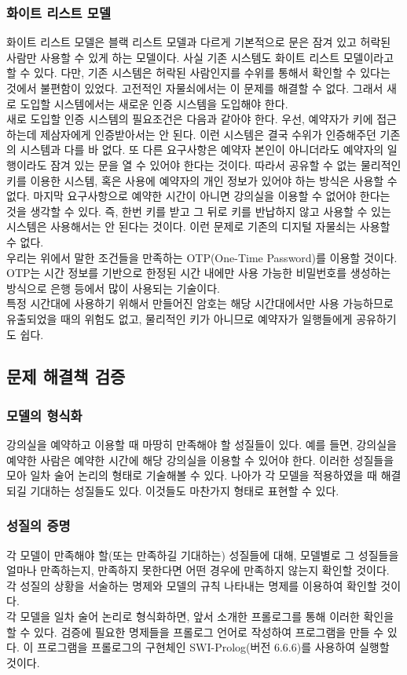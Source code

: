 \documentclass[11pt,a4paper]{article}
\begin{document}
\subsubsection{화이트 리스트 모델}
화이트 리스트 모델은 블랙 리스트 모델과 다르게 기본적으로 문은 잠겨 있고 허락된 사람만 사용할 수 있게 하는 모델이다. 사실 기존 시스템도 화이트 리스트 모델이라고 할 수 있다. 다만, 기존 시스템은 허락된 사람인지를 수위를 통해서 확인할 수 있다는 것에서 불편함이 있었다. 고전적인 자물쇠에서는 이 문제를 해결할 수 없다. 그래서 새로 도입할 시스템에서는 새로운 인증 시스템을 도입해야 한다.\\
새로 도입할 인증 시스템의 필요조건은 다음과 같아야 한다. 우선, 예약자가 키에 접근하는데 제삼자에게 인증받아서는 안 된다. 이런 시스템은 결국 수위가 인증해주던 기존의 시스템과 다를 바 없다. 또 다른 요구사항은 예약자 본인이 아니더라도 예약자의 일행이라도 잠겨 있는 문을 열 수 있어야 한다는 것이다. 따라서 공유할 수 없는 물리적인 키를 이용한 시스템, 혹은 사용에 예약자의 개인 정보가 있어야 하는 방식은 사용할 수 없다. 마지막 요구사항으로 예약한 시간이 아니면 강의실을 이용할 수 없어야 한다는 것을 생각할 수 있다. 즉, 한번 키를 받고 그 뒤로 키를 반납하지 않고 사용할 수 있는 시스템은 사용해서는 안 된다는 것이다. 이런 문제로 기존의 디지털 자물쇠는 사용할 수 없다.\\
우리는 위에서 말한 조건들을 만족하는 OTP(One-Time Password)를 이용할 것이다. OTP는 시간 정보를 기반으로 한정된 시간 내에만 사용 가능한 비밀번호를 생성하는 방식으로 은행 등에서 많이 사용되는 기술이다.\\
특정 시간대에 사용하기 위해서 만들어진 암호는 해당 시간대에서만 사용 가능하므로 유출되었을 때의 위험도 없고, 물리적인 키가 아니므로 예약자가 일행들에게 공유하기도 쉽다.

\subsection{문제 해결책 검증}

\subsubsection{모델의 형식화}
강의실을 예약하고 이용할 때 마땅히 만족해야 할 성질들이 있다. 예를 들면, 강의실을 예약한 사람은 예약한 시간에 해당 강의실을 이용할 수 있어야 한다. 이러한 성질들을 모아 일차 술어 논리의 형태로 기술해볼 수 있다. 나아가 각 모델을 적용하였을 때 해결되길 기대하는 성질들도 있다. 이것들도 마찬가지 형태로 표현할 수 있다.

\subsubsection{성질의 증명}
각 모델이 만족해야 할(또는 만족하길 기대하는) 성질들에 대해, 모델별로 그 성질들을 얼마나 만족하는지, 만족하지 못한다면 어떤 경우에 만족하지 않는지 확인할 것이다. 각 성질의 상황을 서술하는 명제와 모델의 규칙 나타내는 명제를 이용하여 확인할 것이다.\\
각 모델을 일차 술어 논리로 형식화하면, 앞서 소개한 프롤로그를 통해 이러한 확인을 할 수 있다. 검증에 필요한 명제들을 프롤로그 언어로 작성하여 프로그램을 만들 수 있다. 이 프로그램을 프롤로그의 구현체인 SWI-Prolog(버전 6.6.6)를 사용하여 실행할 것이다.
\end{document}
